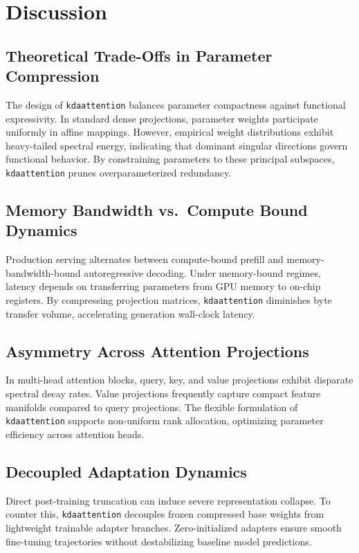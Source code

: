 \section{Discussion}

\subsection{Theoretical Trade-Offs in Parameter Compression}
The design of \texttt{kdaattention} balances parameter compactness against functional expressivity. In standard dense projections, parameter weights participate uniformly in affine mappings. However, empirical weight distributions exhibit heavy-tailed spectral energy, indicating that dominant singular directions govern functional behavior. By constraining parameters to these principal subspaces, \texttt{kdaattention} prunes overparameterized redundancy.

\subsection{Memory Bandwidth vs.\ Compute Bound Dynamics}
Production serving alternates between compute-bound prefill and memory-bandwidth-bound autoregressive decoding. Under memory-bound regimes, latency depends on transferring parameters from GPU memory to on-chip registers. By compressing projection matrices, \texttt{kdaattention} diminishes byte transfer volume, accelerating generation wall-clock latency.

\subsection{Asymmetry Across Attention Projections}
In multi-head attention blocks, query, key, and value projections exhibit disparate spectral decay rates. Value projections frequently capture compact feature manifolds compared to query projections. The flexible formulation of \texttt{kdaattention} supports non-uniform rank allocation, optimizing parameter efficiency across attention heads.

\subsection{Decoupled Adaptation Dynamics}
Direct post-training truncation can induce severe representation collapse. To counter this, \texttt{kdaattention} decouples frozen compressed base weights from lightweight trainable adapter branches. Zero-initialized adapters ensure smooth fine-tuning trajectories without destabilizing baseline model predictions.

